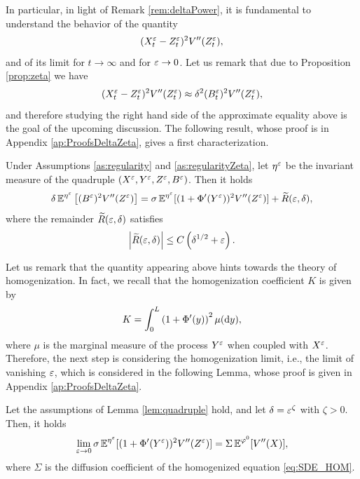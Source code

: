 \documentclass[10pt]{article}
\begin{document}
 In particular, in light of Remark \ref{rem:deltaPower}, it is fundamental to understand the behavior of the quantity
\begin{equation}
	(X_t^\varepsilon - Z_t^\varepsilon)^2 V''(Z_t^\varepsilon),
\end{equation}
and of its limit for $t\to \infty$ and for $\varepsilon \to 0$. Let us remark that due to Proposition \ref{prop:zeta} we have
\begin{equation}
	(X_t^\varepsilon - Z_t^\varepsilon)^2 V''(Z_t^\varepsilon) \approx \delta^2 (B_t^\varepsilon)^2 V''(Z_t^\varepsilon),
\end{equation}
and therefore studying the right hand side of the approximate equality above is the goal of the upcoming discussion. The following result, whose proof is in Appendix \ref{ap:ProofsDeltaZeta}, gives a first characterization.

\begin{lemma} \label{lem:quadruple} Under Assumptions \ref{as:regularity} and \ref{as:regularityZeta}, let $\eta^\varepsilon$ be the invariant measure of the quadruple $(X^\varepsilon, Y^\varepsilon, Z^\varepsilon, B^\varepsilon)$. Then it holds
	\begin{equation}
	\delta \operatorname{\mathbb{E}}^{\eta^\varepsilon} \left[ (B^\varepsilon)^2 V''(Z^\varepsilon)  \right] = \sigma \operatorname{\mathbb{E}}^{\eta^\varepsilon} [(1 + \Phi'(Y^\varepsilon))^2V''(Z^\varepsilon) ] + \widetilde R(\varepsilon,\delta),
	\end{equation}
	where the remainder $\widetilde R(\varepsilon,\delta)$ satisfies
	\begin{equation} \label{eq:quadruple_remainder}
	\left| \widetilde R(\varepsilon,\delta) \right| \le C \left( \delta^{1/2} + \varepsilon \right).
	\end{equation}
\end{lemma}

Let us remark that the quantity appearing above hints towards the theory of homogenization. In fact, we recall that the homogenization coefficient $K$ is given by
\begin{equation}
	K = \int_0^L \left(1 + \Phi'(y)\right)^2 \mu(\mathrm{d} y),
\end{equation}
where $\mu$ is the marginal measure of the process $Y^\varepsilon$ when coupled with $X^\varepsilon$. Therefore, the next step is considering the homogenization limit, i.e., the limit of vanishing $\varepsilon$, which is considered in the following Lemma, whose proof is given in Appendix \ref{ap:ProofsDeltaZeta}.

\begin{lemma} \label{lem:quadruple_convergence} Let the assumptions of Lemma \ref{lem:quadruple} hold, and let $\delta = \varepsilon^\zeta$ with $\zeta > 0$. Then, it holds
	\begin{equation}
	\lim_{\varepsilon \to 0} \sigma \operatorname{\mathbb{E}}^{\eta^\varepsilon} [(1 + \Phi'(Y^\varepsilon))^2V''(Z^\varepsilon) ] = \Sigma \operatorname{\mathbb{E}}^{\varphi^0} [V''(X)],
	\end{equation}
	where $\Sigma$ is the diffusion coefficient of the homogenized equation \ref{eq:SDE_HOM}.
\end{lemma}
\end{document}
